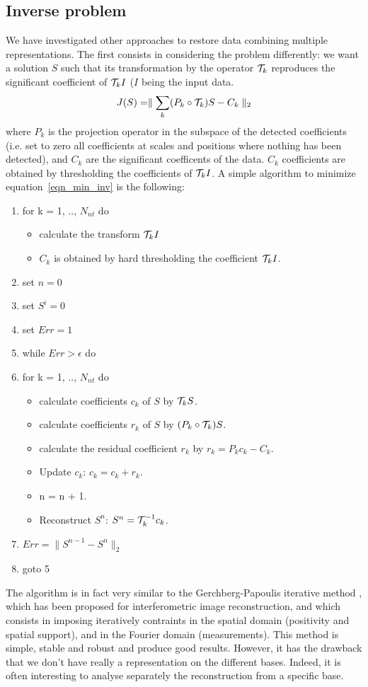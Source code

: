 \documentclass[11pt,a4paper]{article}
\begin{document}
\subsection{Inverse problem}
We have investigated other approaches to restore data combining 
multiple representations. The first consists in considering the problem
differently: we want a solution $S$ such that its transformation by the operator
${\cal T}_k$ reproduces the significant coefficient of ${\cal T}_k I$ ($I$
being the input data. 
\begin{eqnarray}
J(S) = \parallel \sum_k (P_k \circ{\cal T}_k) S - C_k \parallel_2  
\label{eqn_min_inv}
\end{eqnarray}
where $P_k$ is the projection operator in the subspace of the 
detected coefficients (i.e. set to zero all coefficients 
at scales and positions where nothing has been detected), and $C_k$ are the
significant coefficents of the data. $C_k$ coefficients are obtained by
thresholding the coefficients of ${\cal T}_k I$.
A simple algorithm to minimize equation~\ref{eqn_min_inv} is the following:
\begin{enumerate}
\item for k = 1, .., $N_{nt}$ do
\begin{itemize}
\item calculate the transform ${\cal T}_k I$
\item $C_k$ is obtained by hard thresholding the coefficient ${\cal T}_k I$. 
\end{itemize}
\item set $n = 0$
\item set $S^i = 0$
\item set $Err = 1$
\item while $Err > \epsilon$ do
\item for k = 1, .., $N_{nt}$ do
\begin{itemize}
\item calculate coefficients $c_k$ of $S$ by  ${\cal T}_k S$.
\item calculate coefficients $r_k$ of $S$ by  $(P_k \circ{\cal T}_k) S$.
\item calculate the residual coefficient $r_k$ by $r_k = P_k c_k - C_k$.
\item Update $c_k$: $c_k = c_k + r_k$.
\item n = n + 1.
\item Reconstruct $S^n$: $S^n = {\cal T}_k^{-1} c_k$.
\end{itemize}
\item $Err =  \parallel S^{n-1} - S^{n} \parallel_2$
\item goto 5
\end{enumerate}
The algorithm is in fact very similar to the Gerchberg-Papoulis iterative
method \cite{rest:gerchberb74,rest:papoulis75}, which has been proposed 
for interferometric image reconstruction, and which consists in imposing
iteratively contraints in the spatial domain (positivity and spatial support),
and in the Fourier domain (measurements).
This method is simple, stable and robust and produce good results.
However, it has the drawback that we don't have really a representation on 
the different bases. Indeed, it is often interesting to analyse separately
the reconstruction from a specific base.
\end{document}
